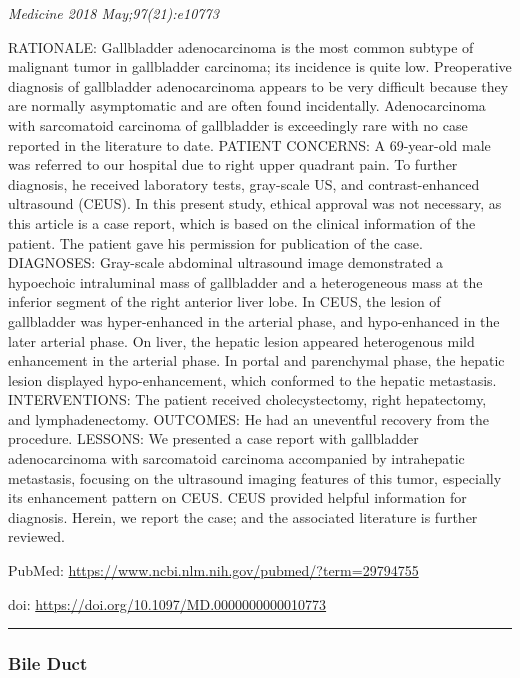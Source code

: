 \documentclass[]{article}
\begin{document}
\emph{Medicine 2018 May;97(21):e10773}

RATIONALE: Gallbladder adenocarcinoma is the most common subtype of
malignant tumor in gallbladder carcinoma; its incidence is quite low.
Preoperative diagnosis of gallbladder adenocarcinoma appears to be very
difficult because they are normally asymptomatic and are often found
incidentally. Adenocarcinoma with sarcomatoid carcinoma of gallbladder
is exceedingly rare with no case reported in the literature to date.
PATIENT CONCERNS: A 69-year-old male was referred to our hospital due to
right upper quadrant pain. To further diagnosis, he received laboratory
tests, gray-scale US, and contrast-enhanced ultrasound (CEUS). In this
present study, ethical approval was not necessary, as this article is a
case report, which is based on the clinical information of the patient.
The patient gave his permission for publication of the case. DIAGNOSES:
Gray-scale abdominal ultrasound image demonstrated a hypoechoic
intraluminal mass of gallbladder and a heterogeneous mass at the
inferior segment of the right anterior liver lobe. In CEUS, the lesion
of gallbladder was hyper-enhanced in the arterial phase, and
hypo-enhanced in the later arterial phase. On liver, the hepatic lesion
appeared heterogenous mild enhancement in the arterial phase. In portal
and parenchymal phase, the hepatic lesion displayed hypo-enhancement,
which conformed to the hepatic metastasis. INTERVENTIONS: The patient
received cholecystectomy, right hepatectomy, and lymphadenectomy.
OUTCOMES: He had an uneventful recovery from the procedure. LESSONS: We
presented a case report with gallbladder adenocarcinoma with sarcomatoid
carcinoma accompanied by intrahepatic metastasis, focusing on the
ultrasound imaging features of this tumor, especially its enhancement
pattern on CEUS. CEUS provided helpful information for diagnosis.
Herein, we report the case; and the associated literature is further
reviewed.

PubMed: \url{https://www.ncbi.nlm.nih.gov/pubmed/?term=29794755}

doi: \url{https://doi.org/10.1097/MD.0000000000010773}

{}

{}

\begin{center}\rule{0.5\linewidth}{\linethickness}\end{center}

\hypertarget{bile-duct}{%
\subsubsection{Bile Duct}\label{bile-duct}}
\end{document}
